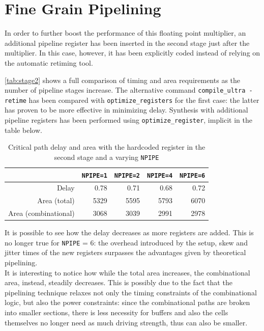 \section{Fine Grain Pipelining}
In order to further boost the performance of this floating point multiplier, an additional pipeline register has been inserted in the second stage just after the multiplier. In this case, however, it has been explicitly coded instead of relying on the automatic retiming tool.

\autoref{tab:stage2} shows a full comparison of timing and area requirements as the number of pipeline stages increase. The alternative command \texttt{compile\_ultra -retime} has been compared with \texttt{optimize\_registers} for the first case: the latter has proven to be more effective in minimizing delay. Synthesis with additional pipeline registers has been performed using \texttt{optimize\_register}, implicit in the table below.

\begin{table}[htbp]
    \centering
	\begin{tabular}{|r|r|r|r|r|}
	\hline
	                       &\texttt{NPIPE=1} & \texttt{NPIPE=2} & \texttt{NPIPE=4} & \texttt{NPIPE=6}\\\hline
	Delay                   & 0.78             & 0.71             & 0.68             & 0.72 \\\hline
    Area (total)           & 5329             & 5595             & 5793             & 6070 \\\hline
    Area (combinational)   & 3068             & 3039             & 2991             & 2978 \\\hline
	\end{tabular}
	\caption{Critical path delay and area with the hardcoded register in the second stage and a varying \texttt{NPIPE}}
	\label{tab:stage2}
\end{table}
It is possible to see how the delay decreases as more registers are added. This is no longer true for \texttt{NPIPE} = 6: the overhead introduced by the setup, skew and jitter times of the new registers surpasses the advantages given by theoretical pipelining.\\
It is interesting to notice how while the total area increases, the combinational area, instead, steadily decreases. This is possibly due to the fact that the pipelining technique relaxes not only the timing constraints of the combinational logic, but also the power constraints: since the combinational paths are broken into smaller sections, there is less necessity for buffers and also the cells themselves no longer need as much driving strength, thus can also be smaller.

